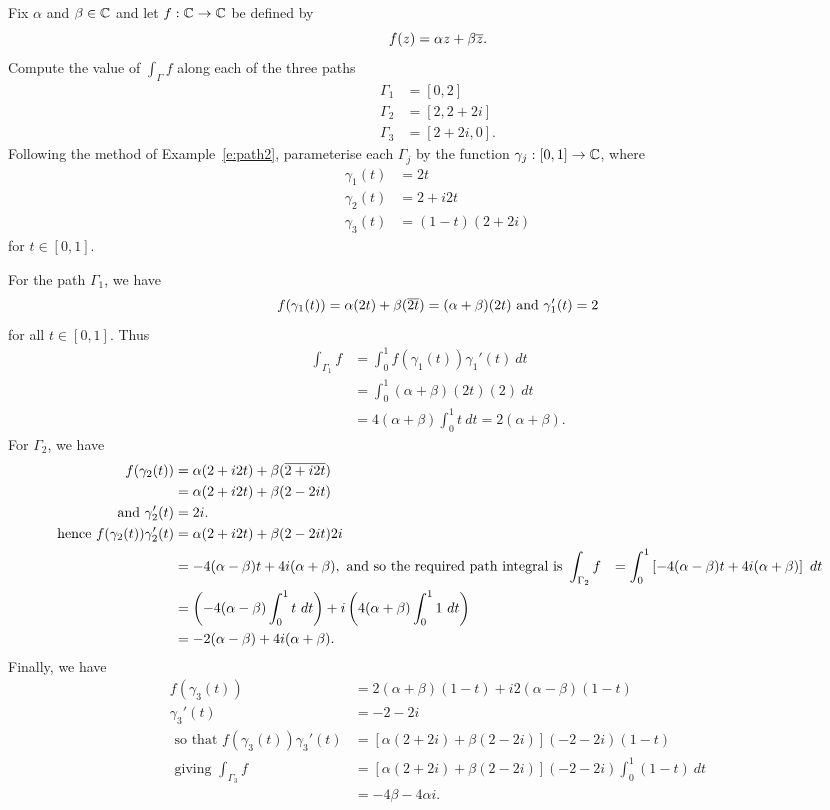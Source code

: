 \begin{example}
\label{e:3paths}
Fix $\alpha$ and $\beta \in \mathbb{C}$ and let $f:\mathbb{C} \to \mathbb{C}$ be defined by
\[
f(z) = \alpha z + \beta \overline{z}.
\]
Compute the value of $\int_{\Gamma} f$ along each of the three paths
\begin{align*}
 \Gamma_1&=[0,2]\\
 \Gamma_2&=[2,2+2i] \\
 \Gamma_3 &=[2+2i,0].
\end{align*}
Following the method of Example~\ref{e:path2}, parameterise each $\Gamma_j$ by the function $\gamma_j:[0,1] \to \mathbb{C}$, where
\begin{align*}
\gamma_1 (t) & = 2t \\
\gamma_2 (t) &= 2+i 2t \\
\gamma_3 (t) & = (1-t)(2+2i)
\end{align*}
for $t \in [0,1]$.

For the path $\Gamma_1$, we have
\[
f (\gamma_1 (t) ) = \alpha (2t)+\beta (\overline{2t}) = (\alpha+\beta)(2t) \text{ and } \gamma_1'(t) = 2
\]
for all $t \in [0,1]$.  Thus 
\begin{align*}
\int_{\Gamma_1} f &= \int_0^1 f( \gamma_1(t)) \gamma_1'(t)\ dt \\
&= \int_0^1 (\alpha+\beta)(2t)(2)\ dt \\
& = 4(\alpha+\beta) \int_0^1 t\ dt = 2(\alpha+\beta). 
\end{align*}
For $\Gamma_2$, we have
\begin{align*}
f ( \gamma_2(t)) & = \alpha (2+i2t)+\beta ( \overline{2+i2t} ) \\
& = \alpha (2+i2t)+\beta (2-2it) \\
\mbox{ and }
\gamma_2'(t) &= 2i. \\
\mbox{ hence }
f ( \gamma_2(t) ) \gamma_2' (t) & = \alpha (2+i2t)+\beta (2-2it) 2i \\
& = -4(\alpha-\beta)t + 4i (\alpha+\beta),
\mbox{ and so the required path integral is }
\int_{\Gamma_2} f& = \int_0^1 \left[-4(\alpha-\beta)t + 4i (\alpha+\beta)\right]\ dt \\
& = \left( -4(\alpha-\beta) \int_0^1 t\ dt \right) +i \left( 4(\alpha+\beta) \int_0^1 1\ dt \right) \\
& = -2(\alpha-\beta)+4i(\alpha+\beta).
\end{align*}
Finally, we have
\begin{align*}
f ( \gamma_3 (t) ) & = 2(\alpha+\beta)(1-t)+i 2 (\alpha-\beta)(1-t) \\
\gamma_3'(t) & = -2-2i \\
\mbox{ so that }
f ( \gamma_3 (t)) \gamma_3'(t) & = \left[ \alpha (2+2i)+\beta(2-2i) \right] (-2-2i)(1-t) \\
\mbox{ giving }
\int_{\Gamma_3} f & = \left[ \alpha (2+2i)+\beta(2-2i) \right] (-2-2i) \int_0^1 (1-t)\ dt \\
& = -4\beta-4\alpha i.
\end{align*}
\end{example}

